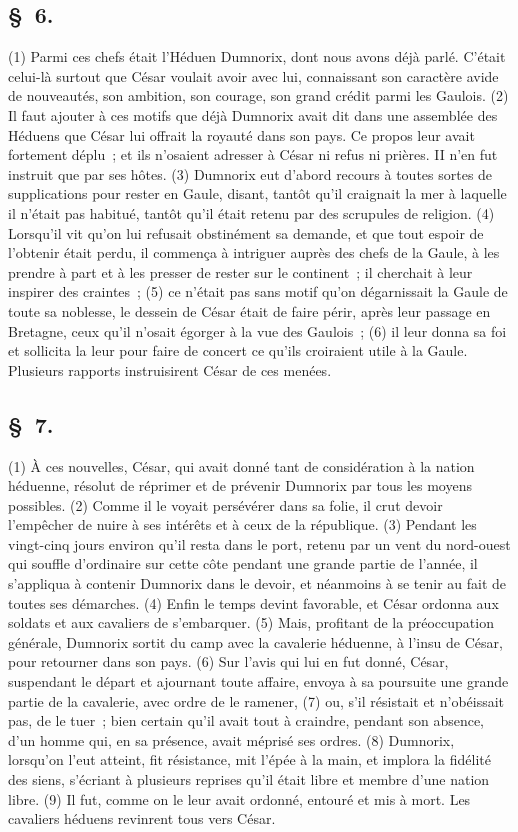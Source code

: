 \documentclass[french,twoside]{book} %
\begin{document}
\subsection[{§ 6.}]{ \textsc{§ 6.} }
\noindent (1) Parmi ces chefs était l’Héduen Dumnorix, dont nous avons déjà parlé. C'était celui-là surtout que César voulait avoir avec lui, connaissant son caractère avide de nouveautés, son ambition, son courage, son grand crédit parmi les Gaulois. (2) Il faut ajouter à ces motifs que déjà Dumnorix avait dit dans une assemblée des Héduens que César lui offrait la royauté dans son pays. Ce propos leur avait fortement déplu ; et ils n’osaient adresser à César ni refus ni prières. II n’en fut instruit que par ses hôtes. (3) Dumnorix eut d’abord recours à toutes sortes de supplications pour rester en Gaule, disant, tantôt qu’il craignait la mer à laquelle il n’était pas habitué, tantôt qu’il était retenu par des scrupules de religion. (4) Lorsqu’il vit qu’on lui refusait obstinément sa demande, et que tout espoir de l’obtenir était perdu, il commença à intriguer auprès des chefs de la Gaule, à les prendre à part et à les presser de rester sur le continent ; il cherchait à leur inspirer des craintes ; (5) ce n’était pas sans motif qu’on dégarnissait la Gaule de toute sa noblesse, le dessein de César était de faire périr, après leur passage en Bretagne, ceux qu’il n’osait égorger à la vue des Gaulois ; (6) il leur donna sa foi et sollicita la leur pour faire de concert ce qu’ils croiraient utile à la Gaule. Plusieurs rapports instruisirent César de ces menées.
\subsection[{§ 7.}]{ \textsc{§ 7.} }
\noindent (1) À ces nouvelles, César, qui avait donné tant de considération à la nation héduenne, résolut de réprimer et de prévenir Dumnorix par tous les moyens possibles. (2) Comme il le voyait persévérer dans sa folie, il crut devoir l’empêcher de nuire à ses intérêts et à ceux de la république. (3) Pendant les vingt-cinq jours environ qu’il resta dans le port, retenu par un vent du nord-ouest qui souffle d’ordinaire sur cette côte pendant une grande partie de l’année, il s’appliqua à contenir Dumnorix dans le devoir, et néanmoins à se tenir au fait de toutes ses démarches. (4) Enfin le temps devint favorable, et César ordonna aux soldats et aux cavaliers de s’embarquer. (5) Mais, profitant de la préoccupation générale, Dumnorix sortit du camp avec la cavalerie héduenne, à l’insu de César, pour retourner dans son pays. (6) Sur l’avis qui lui en fut donné, César, suspendant le départ et ajournant toute affaire, envoya à sa poursuite une grande partie de la cavalerie, avec ordre de le ramener, (7) ou, s’il résistait et n’obéissait pas, de le tuer ; bien certain qu’il avait tout à craindre, pendant son absence, d’un homme qui, en sa présence, avait méprisé ses ordres. (8) Dumnorix, lorsqu’on l’eut atteint, fit résistance, mit l’épée à la main, et implora la fidélité des siens, s’écriant à plusieurs reprises qu’il était libre et membre d’une nation libre. (9) Il fut, comme on le leur avait ordonné, entouré et mis à mort. Les cavaliers héduens revinrent tous vers César.
\end{document}
